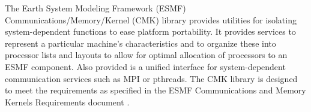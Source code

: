 %


The Earth System Modeling Framework (ESMF) Communications/Memory/Kernel (CMK)
library provides utilities for isolating system-dependent functions to ease
platform portability.  It provides services to represent a particular machine's
characteristics and to organize these into processor lists and layouts to
allow for optimal allocation of processors to an ESMF component. Also provided
is a unified interface for system-dependent communication services such as
MPI or pthreads.  The CMK library is designed to meet the requirements as
specified in the ESMF Communications and Memory Kernels Requirements document
\cite {commmem_req}.

